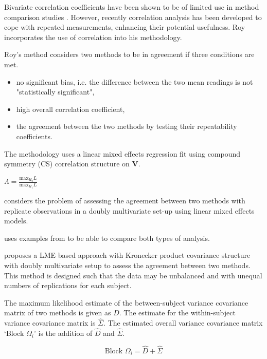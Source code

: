 \documentclass[12pt, a4paper]{report}
\begin{document}
Bivariate correlation coefficients have been shown to be of
limited use in method comparison studies \citep{BA86}. However,
recently correlation analysis has been developed to cope with
repeated measurements, enhancing their potential usefulness. Roy
incorporates the use of correlation into his methodology.

Roy's method considers two methods to be in agreement if three
conditions are met.

\begin{itemize}
\item no significant bias, i.e. the difference between the two
mean readings is not "statistically significant",

\item high overall correlation coefficient,

\item the agreement between the two methods by testing their
repeatability coefficients.

\end{itemize}

The methodology uses a linear mixed effects regression fit using
compound symmetry (CS) correlation structure on \textbf{V}.


$\Lambda = \frac{\mbox{max}_{H_{0}}L}{\mbox{max}_{H_{1}}L}$

\newpage

\citet{ARoy2009} considers the problem of assessing the agreement
between two methods with replicate observations in a doubly
multivariate set-up using linear mixed effects models.

\citet{ARoy2009} uses examples from \citet{BA86} to be able to
compare both types of analysis.

\citet{ARoy2009} proposes a LME based approach with Kronecker
product covariance structure with doubly multivariate setup to
assess the agreement between two methods. This method is designed
such that the data may be unbalanced and with unequal numbers of
replications for each subject.

The maximum likelihood estimate of the between-subject variance
covariance matrix of two methods is given as $D$. The estimate for
the within-subject variance covariance matrix is $\hat{\Sigma}$.
The estimated overall variance covariance matrix `Block
$\Omega_{i}$' is the addition of $\hat{D}$ and $\hat{\Sigma}$.


\begin{equation}
\mbox{Block  }\Omega_{i} = \hat{D} + \hat{\Sigma}
\end{equation}
\end{document}
